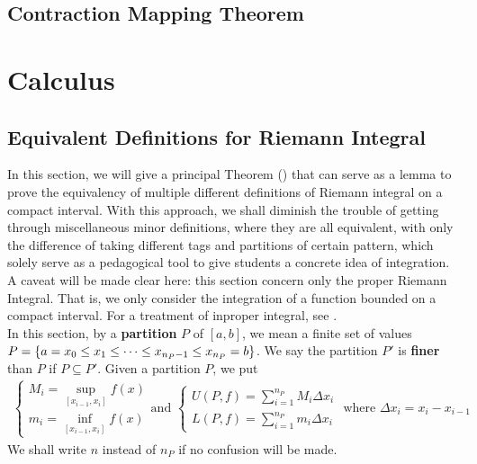 \documentclass{report}
\begin{document}
\section{Contraction Mapping Theorem}
\chapter{Calculus}

\section{Equivalent Definitions for Riemann Integral}
\begin{mdframed}
In this section, we will give a principal Theorem () that can serve as a lemma to prove the equivalency of multiple different definitions of Riemann integral on a compact interval. With this approach, we shall diminish the trouble of getting through miscellaneous minor definitions, where they are all equivalent, with only the difference of taking different tags and partitions of certain pattern, which solely serve as a pedagogical tool to give students a concrete idea of integration.\\

A caveat will be made clear here: this section concern only the proper Riemann Integral. That is, we only consider the integration of a function bounded on a compact interval. For a treatment of inproper integral, see .\\

In this section, by a \textbf{partition} $P$ of $[a,b]$, we mean a finite set of values $P=\{ a=x_0 \leq  x_1 \leq  \cdots \leq  x_{n_P-1} \leq x_{n_P} =b \}$. We say the partition $P'$ is \textbf{finer} than $P$ if $P\subseteq P'$. Given a partition $P$, we put
\begin{align*}
\begin{cases}  
M_i=\sup_{[x_{i-1},x_i]} f(x)\\
m_i=\inf_{[x_{i-1},x_i]}f(x)
\end{cases}\text{and }\begin{cases}
  U(P,f)=\sum_{i=1}^{n_P} M_i \Delta x_i\\
  L(P,f)=\sum_{i=1}^{n_P}m_i\Delta x_i
\end{cases}\text{ where }\Delta x_i= x_i-x_{i-1}
\end{align*}
We shall write $n$ instead of $n_P$ if no confusion will be made.\\



\end{mdframed}
\end{document}
